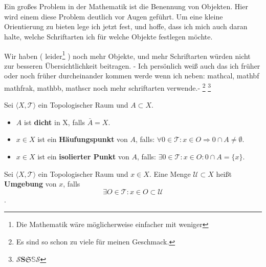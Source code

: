 \chapter{}
Ein großes Problem in der Mathematik ist die Benennung von Objekten.
Hier wird einem diese Problem deutlich vor Augen geführt.
Um eine kleine Orientierung zu bieten lege ich jetzt fest, und hoffe, dass
ich mich auch daran halte, welche Schriftarten ich für welche Objekte festlegen
möchte.

Wir haben ( leider\footnote{Die Mathematik wäre möglicherweise einfacher mit weniger} ) 
noch mehr Objekte, und mehr Schriftarten würden nicht zur besseren
Übersichtlichkeit beitragen.  - Ich persönlich weiß auch das ich früher 
oder noch früher durcheinander kommen werde wenn ich neben:
mathcal{}, mathbf{} mathfrak{}, mathbb{}, mathscr{} noch mehr schriftarten verwende.-
\footnote{ Es sind so schon zu viele für meinen Geschmack.}
\footnote{$\mathcal{S} \mathbf{S} \mathfrak{S} \mathbb{S} \mathscr{S}$} 


{
    Sei $\langle X, \mathcal{T}\rangle$ ein Topologischer Raum und $A \subset X$.
\begin{itemize}
    \item $A$ ist \textbf{dicht} in X, falls $\bar{A} = X$.
    \item $x \in X$ ist ein \textbf{Häufungspunkt} von $A$, falls:
     $\forall 0 \in \mathcal{T} : x \in O \Rightarrow 0 \cap A \neq \emptyset$.
    \item $x \in X$ ist ein \textbf{isolierter Punkt} von $A$, falls:
     $\exists 0 \in \mathcal{T} : x \in O : 0 \cap A = \{x\}$.
\end{itemize}
}

{
    Sei $\langle X, \mathcal{T}\rangle$ ein Topologischer Raum und $x \in X$.
    Eine Menge $\mathcal{U} \subset X$ heißt \textbf{Umgebung} von $x$, falls
    $$
    \exists O \in \mathcal{T} : x \in O \subset \mathcal{U}
    $$.
}

